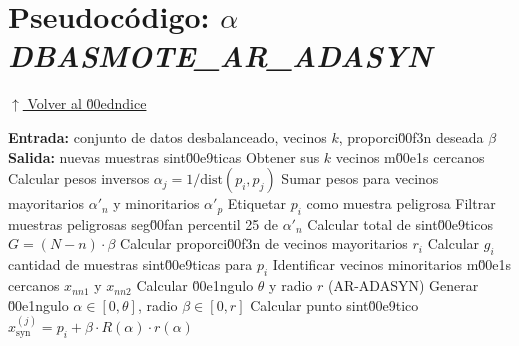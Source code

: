 \section*{Pseudocódigo: \textit{\boldmath$\alpha$DBASMOTE\_AR\_ADASYN}}
\noindent\hypertarget{pseudocodigo_alfa_dbasmote_ar_adasyn}{}\hyperlink{toc}{\small$\uparrow$ Volver al \u00edndice}

\begin{algorithm}[H]
\caption{Sobremuestreo h\u00edbrido \boldmath$\alpha$DBASMOTE\_AR\_ADASYN}
\begin{algorithmic}[1]
\State \textbf{Entrada:} conjunto de datos desbalanceado, vecinos $k$, proporci\u00f3n deseada $\beta$
\State \textbf{Salida:} nuevas muestras sint\u00e9ticas
  \State Obtener sus $k$ vecinos m\u00e1s cercanos
  \State Calcular pesos inversos $\alpha_j = 1/\text{dist}(p_i, p_j)$
  \State Sumar pesos para vecinos mayoritarios $\alpha'_n$ y minoritarios $\alpha'_p$
    \State Etiquetar $p_i$ como muestra peligrosa
  \EndIf
\EndFor
\State Filtrar muestras peligrosas seg\u00fan percentil 25 de $\alpha'_n$
\State Calcular total de sint\u00e9ticos $G = (N - n) \cdot \beta$
  \State Calcular proporci\u00f3n de vecinos mayoritarios $r_i$
  \State Calcular $g_i$ cantidad de muestras sint\u00e9ticas para $p_i$
  \State Identificar vecinos minoritarios m\u00e1s cercanos $x_{nn1}$ y $x_{nn2}$
  \State Calcular \u00e1ngulo $\theta$ y radio $r$ (AR-ADASYN)
    \State Generar \u00e1ngulo $\alpha \in [0, \theta]$, radio $\beta \in [0, r]$
    \State Calcular punto sint\u00e9tico $x^{(j)}_{\text{syn}} = p_i + \beta \cdot R(\alpha) \cdot r(\alpha)$
  \EndFor
\EndFor
\end{algorithmic}
\end{algorithm}
